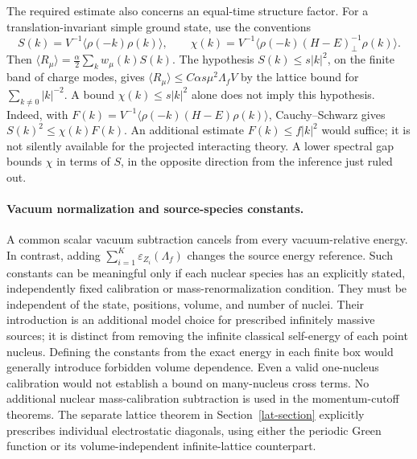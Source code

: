 The required estimate also concerns an equal-time structure factor.
For a translation-invariant simple ground state, use the conventions
\[
 S(k)=V^{-1}\langle\rho(-k)\rho(k)\rangle,
 \qquad
 \chi(k)=V^{-1}\langle\rho(-k)(H-E)^{-1}_{\perp}\rho(k)\rangle.
\]
Then $\langle R_\mu\rangle=\frac\alpha2\sum_k w_\mu(k)S(k)$.
The hypothesis $S(k)\leq s|k|^2$, on the finite band of charge modes,
gives $\langle R_\mu\rangle\leq C\alpha s\mu^2\Lambda_f V$ by the
lattice bound for $\sum_{k\ne0}|k|^{-2}$.
A bound $\chi(k)\leq s|k|^2$ alone does not imply this hypothesis.
Indeed, with
$F(k)=V^{-1}\langle\rho(-k)(H-E)\rho(k)\rangle$,
Cauchy--Schwarz gives $S(k)^2\leq\chi(k)F(k)$.
An additional estimate $F(k)\leq f|k|^2$ would suffice; it is not
silently available for the projected interacting theory.  A lower
spectral gap bounds $\chi$ in terms of $S$, in the opposite direction
from the inference just ruled out.

\paragraph{Vacuum normalization and source-species constants.}
A common scalar vacuum subtraction cancels from every vacuum-relative
energy.  In contrast, adding
$\sum_{i=1}^K\varepsilon_{Z_i}(\Lambda_f)$ changes the source energy
reference.  Such constants can be meaningful only if each nuclear
species has an explicitly stated, independently fixed calibration or
mass-renormalization condition.  They must be independent of the state,
positions, volume, and number of nuclei.  Their introduction is an
additional model choice for prescribed infinitely massive sources;
it is distinct from removing the infinite classical self-energy of
each point nucleus.  Defining the constants from the exact energy in
each finite box would generally introduce forbidden volume dependence.
Even a valid one-nucleus calibration would not establish a bound on
many-nucleus cross terms. No additional nuclear mass-calibration
subtraction is used in the momentum-cutoff theorems. The separate
lattice theorem in Section~\ref{lat-section} explicitly prescribes
individual electrostatic diagonals, using either the periodic Green
function or its volume-independent infinite-lattice counterpart.

